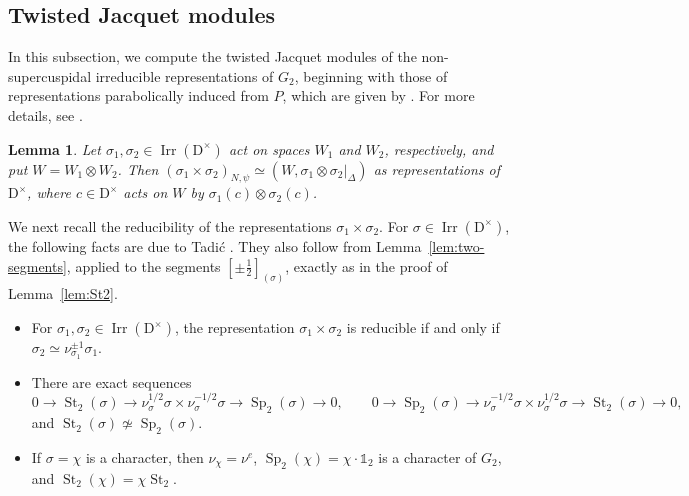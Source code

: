 \documentclass[11pt]{amsart}
\numberwithin{equation}{section}
\theoremstyle{plain}
\newtheorem{lemma}[theorem]{Lemma}
\theoremstyle{definition}
\theoremstyle{remark}
\newcommand{\one}{\mathds{1}}
\DeclareMathOperator{\Hom}{Hom}
\DeclareMathOperator{\Irr}{Irr}
\DeclareMathOperator{\St}{St}
\DeclareMathOperator{\Sp}{Sp}
\begin{document}
%	

\subsection{Twisted Jacquet modules}\label{ss:twisted-jacquet}
In this subsection, we compute the twisted Jacquet modules of the non-supercuspidal irreducible representations of $G_2$, beginning with those of representations parabolically induced from $P$, which are given by \cite[Theorem 2.1]{PR00}. For more details, see \cite{Pra99}.

\begin{lemma}\label{lem:tw-jacquet-ps}
	Let $\sigma_1,\sigma_2\in\Irr(\mathrm{D}^\times)$ act on spaces $W_1$ and $W_2$, respectively, and put $W=W_1\otimes W_2$. Then $(\sigma_1\times\sigma_2)_{N,\psi}\simeq(W,\sigma_1\otimes\sigma_2|_\Delta)$ as representations of $\mathrm{D}^\times$, where $c\in\mathrm{D}^\times$ acts on $W$ by $\sigma_1(c)\otimes\sigma_2(c)$.
\end{lemma}

We next recall the reducibility of the representations $\sigma_1\times\sigma_2$. For $\sigma\in\Irr(\mathrm{D}^\times)$, the following facts are due to Tadi\'c \cite{Tad90}. They also follow from Lemma~\ref{lem:two-segments}, applied to the segments $[\pm\frac12]_{(\sigma)}$, exactly as in the proof of Lemma~\ref{lem:St2}.
\begin{itemize}
	\item[(T1)] For $\sigma_1,\sigma_2\in\Irr(\mathrm{D}^\times)$, the representation $\sigma_1\times\sigma_2$ is reducible if and only if $\sigma_2\simeq\nu_{\sigma_1}^{\pm1}\sigma_1$.
	\item[(T2)] There are exact sequences
	$$
	0\to\St_2(\sigma)\to\nu_\sigma^{1/2}\sigma\times\nu_\sigma^{-1/2}\sigma\to\Sp_2(\sigma)\to0,\qquad0\to\Sp_2(\sigma)\to\nu_\sigma^{-1/2}\sigma\times\nu_\sigma^{1/2}\sigma\to\St_2(\sigma)\to0,
	$$
	and $\St_2(\sigma)\not\simeq\Sp_2(\sigma)$.
	\item[(T3)] If $\sigma=\chi$ is a character, then $\nu_\chi=\nu^e$, $\Sp_2(\chi)=\chi\cdot\one_2$ is a character of $G_2$, and $\St_2(\chi)=\chi\St_2$.
\end{itemize}
\end{document}
